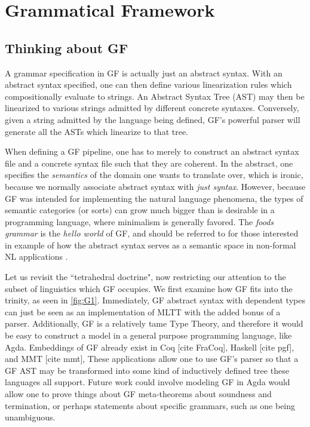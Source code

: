 \section{Grammatical Framework}

\subsection{Thinking about GF}

A grammar specification in GF is actually just an abstract syntax. With an abstract
syntax specified, one can then define various linearization rules which
compositionally evaluate to strings. An Abstract Syntax Tree (AST) may then be
linearized to various strings admitted by different concrete syntaxes.
Conversely, given a string admitted by the language being defined, GF's powerful
parser will generate all the ASTs which linearize to that tree.

When defining a GF pipeline, one has to merely to construct an abstract syntax
file and a concrete syntax file such that they are coherent. In the abstract,
one specifies the \emph{semantics} of the domain one wants to translate over,
which is ironic, because we normally associate abstract syntax with \emph{just
syntax}. However, because GF was intended for implementing the natural language
phenomena, the types of semantic categories (or sorts) can grow much bigger than
is desirable in a programming language, where minimalism is generally favored.
The \emph{foods grammar} is the \emph{hello world} of GF, and should be referred
to for those interested in example of how the abstract syntax serves as a
semantic space in non-formal NL applications \cite{ranta2011grammatical}.

Let us revisit the ``tetrahedral doctrine", now restricting our attention to the
subset of linguistics which GF occupies. We first examine how GF fits into the
trinity, as seen in  \autoref{fig:G1}. Immediately, GF abstract syntax with
dependent types can just be seen as an
implementation of MLTT with the added bonus of a parser.  Additionally, GF is a
relatively tame Type Theory, and therefore it would be easy to construct a model
in a general purpose programming language, like Agda.  Embeddings of GF already
exist in Coq [cite FraCoq], Haskell [cite pgf], and MMT [cite mmt],  These applications allow one to use GF's
parser so that a GF AST may be transformed into some kind of
inductively defined tree these languages all support. Future work could involve
modeling GF in Agda would allow one to prove things about GF
meta-theorems about soundness and termination, or perhaps statements about
specific grammars, such as one being unambiguous.

